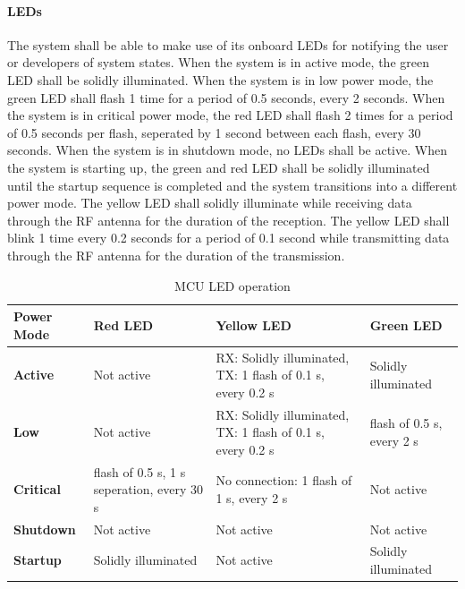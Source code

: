 \paragraph{LEDs} The system shall be able to make use of its onboard LEDs for notifying the user or developers of system states. When the system is in active mode, the green LED shall be solidly illuminated. When the system is in low power mode, the green LED shall flash 1 time for a period of 0.5 seconds, every 2 seconds. When the system is in critical power mode, the red LED shall flash 2 times for a period of 0.5 seconds per flash, seperated by 1 second between each flash, every 30 seconds. When the system is in shutdown mode, no LEDs shall be active. When the system is starting up, the green and red LED shall be solidly illuminated until the startup sequence is completed and the system transitions into a different power mode. The yellow LED shall solidly illuminate while receiving data through the RF antenna for
the duration of the reception. The yellow LED shall blink 1 time every 0.2 seconds for a period of 0.1 second while transmitting data through the RF antenna for the duration of the transmission.

\begin{table}
	\centering
	\begin{tabularx}{\textwidth}
		{
			| >{\raggedright\arraybackslash}X
			| >{\raggedright\arraybackslash}X
			| >{\raggedright\arraybackslash}X
			| >{\raggedright\arraybackslash}X
			|
		}
		\caption{MCU LED operation}
		\label{table:mcu_leds} \\
		\hline
		\textbf{Power Mode} & \textbf{Red LED} & \textbf{Yellow LED} & \textbf{Green LED} \\
		\hline
        \textbf{Active} & Not active & RX: Solidly illuminated, TX: 1 flash of 0.1 s, every 0.2 s & Solidly illuminated \\
        \hline
        \textbf{Low} & Not active & RX: Solidly illuminated, TX: 1 flash of 0.1 s, every 0.2 s & 1 flash of 0.5 s, every 2 s \\
        \hline
        \textbf{Critical} & 2 flash of 0.5 s, 1 s seperation, every 30 s & No connection: 1 flash of 1 s, every 2 s & Not active \\
        \hline
        \textbf{Shutdown} & Not active & Not active & Not active \\
        \hline
        \textbf{Startup} & Solidly illuminated & Not active & Solidly illuminated \\
        \hline
	\end{tabularx}
\end{table}

